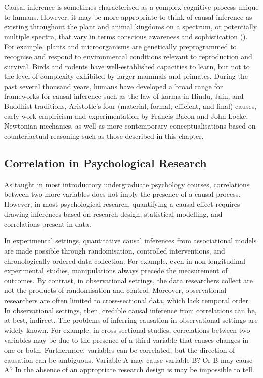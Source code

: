 \documentclass[
  singlecolumn]{article}
\begin{document}
Causal inference is sometimes characterised as a complex cognitive
process unique to humans. However, it may be more appropriate to think
of causal inference as existing throughout the plant and animal kingdoms
on a spectrum, or potentially multiple spectra, that vary in terms
conscious awareness and sophistication
(). For example,
plants and microorganisms are genetically preprogrammed to recognise and
respond to environmental conditions relevant to reproduction and
survival. Birds and rodents have well-established capacities to learn,
but not to the level of complexity exhibited by larger mammals and
primates. During the past several thousand years, humans have developed
a broad range for frameworks for causal inference such as the law of
karma in Hindu, Jain, and Buddhist traditions, Aristotle's four
(material, formal, efficient, and final) causes, early work empiricism
and experimentation by Francis Bacon and John Locke, Newtonian
mechanics, as well as more contemporary conceptualisations based on
counterfactual reasoning such as those described in this chapter.

\subsection{Correlation in Psychological
Research}\label{correlation-in-psychological-research}

As taught in most introductory undergraduate psychology courses,
correlations between two more variables does not imply the presence of a
causal process. However, in most psychological research, quantifying a
causal effect requires drawing inferences based on research design,
statistical modelling, and correlations present in data.

In experimental settings, quantitative causal inferences from
associational models are made possible through randomisation, controlled
interventions, and chronologically ordered data collection. For example,
even in non-longitudinal experimental studies, manipulations always
precede the measurement of outcomes. By contrast, in observational
settings, the data researchers collect are not the products of
randomisation and control. Moreover, observational researchers are often
limited to cross-sectional data, which lack temporal order. In
observational settings, then, credible causal inference from
correlations can be, at best, indirect. The problems of inferring
causation in observational settings are widely known. For example, in
cross-sectional studies, correlations between two variables may be due
to the presence of a third variable that causes changes in one or both.
Furthermore, variables can be correlated, but the direction of causation
can be ambiguous. Variable A may cause variable B? Or B may cause A? In
the absence of an appropriate research design is may be impossible to
tell.
\end{document}
